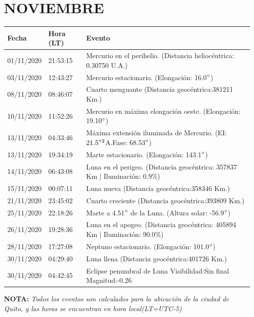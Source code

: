 \documentclass[12pt,a4paper,oneside]{article}
\begin{document}
\section{NOVIEMBRE}
\begin{center}
\begin{tabular}{ |l| l| l| }
\hline
 \textbf{Fecha} & \textbf{Hora (LT)} & \textbf{Evento}\\
 \hline
01/11/2020 &  21:53:15   &  Mercurio en el perihelio. (Distancia heliocéntrica: 0.30750 U.A.)	  \\
03/11/2020 &  12:43:27   &  Mercurio estacionario. (Elongación: 16.0$\degree$)	  \\
08/11/2020 &  08:46:07   &  Cuarto menguante (Distancia geocéntrica:381211 Km.)	  \\
10/11/2020 &  11:52:26   &  Mercurio en máxima elongación oeste. (Elongación: 19.10$\degree$)	  \\
13/11/2020 &  04:33:46   &  Máxima extensión iluminada de Mercurio. (EI: $21.5"^2 $A.Fase: 68.53$\degree$) 	  \\
13/11/2020 &  19:34:19   &  Marte estacionario. (Elongación: 143.1$\degree$)	  \\
14/11/2020 &  06:43:08   &  Luna en el perigeo. (Distancia geocéntrica: 357837 Km | Iluminación: 0.9\%)	  \\
15/11/2020 &  00:07:11   &  Luna nueva (Distancia geocéntrica:358346 Km.)	  \\  
21/11/2020 &  23:45:02   &  Cuarto creciente (Distancia geocéntrica:393809 Km.)	  \\
25/11/2020 &  22:18:26   &  Marte a 4.51$\degree$ de la Luna. (Altura solar: -56.9$\degree$)	  \\
26/11/2020 &  19:28:36   &  Luna en el apogeo. (Distancia geocéntrica: 405894 Km | Iluminación: 90.0\%)	  \\
28/11/2020 &  17:27:08   &  Neptuno estacionario. (Elongación: 101.0$\degree$)	  \\
30/11/2020 &  04:29:40   &  Luna llena (Distancia geocéntrica:401726 Km.)	  \\
30/11/2020 &  04:42:45   &  Eclipse penumbral de Luna Visibilidad:Sin final Magnitud:-0.26	\\
\hline
\end{tabular}
\end{center}
\vspace{1cm}
\textbf{NOTA:  }\textit{Todos los eventos son calculados para la ubicaci\'on de la ciudad de Quito, y las horas se encuentran en hora local(LT=UTC-5)}
\vspace{0.7cm}
\newpage
\end{document}
